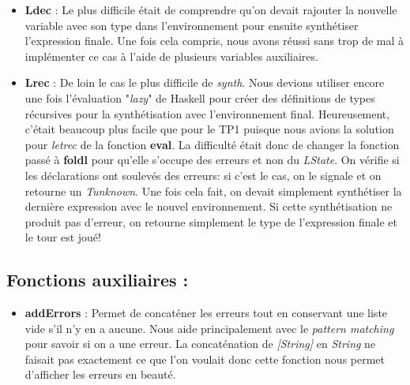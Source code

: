 \documentclass{article}
\begin{document}
\begin{itemize}
    \item \textbf{Ldec} : Le plus difficile était de comprendre qu'on devait rajouter la nouvelle variable avec son type dans l'environnement pour ensuite synthétiser l'expression finale. Une fois cela compris, nous avons réussi sans trop de mal à implémenter ce cas à l'aide de plusieurs variables auxiliaires.
    \item \textbf{Lrec} : De loin le cas le plus difficile de \textit{synth}. Nous devions utiliser encore une fois l'évaluation "\textit{lazy}" de Haskell pour créer des définitions de types récursives pour la synthétisation avec l'environnement final. Heureusement, c'était beaucoup plus facile que pour le TP1 puisque nous avions la solution pour \textit{letrec} de la fonction \textbf{eval}. La difficulté était donc de changer la fonction passé à \textbf{foldl} pour qu'elle s'occupe des erreurs et non du \textit{LState}. On vérifie si les déclarations ont soulevés des erreurs: si c'est le cas, on le signale et on retourne un \textit{Tunknown}. Une fois cela fait, on devait simplement synthétiser la dernière expression avec le nouvel environnement. Si cette synthétisation ne produit pas d'erreur, on retourne simplement le type de l'expression finale et le tour est joué!
\end{itemize}

\subsection{Fonctions auxiliaires :}

\begin{itemize}
    \item \textbf{addErrors} : Permet de concaténer les erreurs tout en conservant une liste vide s'il n'y en a aucune. Nous aide principalement avec le \textit{pattern matching} pour savoir si on a une erreur. La concaténation de \textit{[String]} en \textit{String} ne faisait pas exactement ce que l'on voulait donc cette fonction nous permet d'afficher les erreurs en beauté.
\end{itemize}
\end{document}
